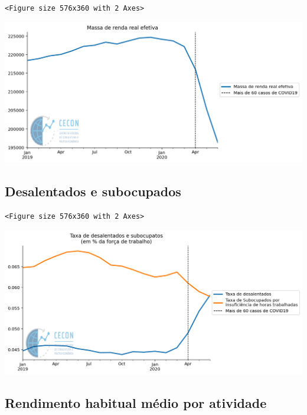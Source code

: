 \documentclass[11pt]{article}
\begin{document}
\begin{verbatim}
<Figure size 576x360 with 2 Axes>
\end{verbatim}


\begin{center}
\includegraphics[width=.9\linewidth]{obipy-resources/62e383af79e91b63c7fc98dd7fb55b3c3ececcb9/7b199b092ebb99347bc392053d94a38e134f803e.png}
\end{center}


\subsection{Desalentados e subocupados}
\label{sec:org48ed65d}

\begin{verbatim}
<Figure size 576x360 with 2 Axes>
\end{verbatim}


\begin{center}
\includegraphics[width=.9\linewidth]{obipy-resources/62e383af79e91b63c7fc98dd7fb55b3c3ececcb9/6de2829bdcf733dd1346f9636df833b29a286378.png}
\end{center}

\subsection{Rendimento habitual médio por atividade}
\label{sec:orgb356fbd}
\end{document}
